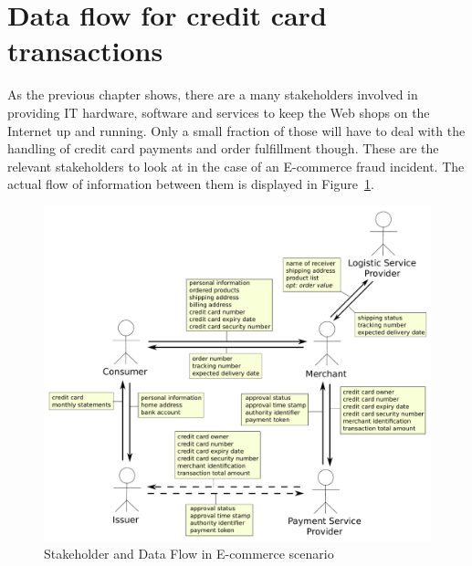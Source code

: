 
\section{Data flow for credit card transactions}
\label{sec:stakeholder_data_flow}

As the previous chapter shows, there are a many stakeholders involved in providing \gls{IT} hardware, software and services to keep the Web shops on the Internet up and running. Only a small fraction of those will have to deal with the handling of credit card payments and order fulfillment though. These are the relevant stakeholders to look at in the case of an \gls{E-commerce} fraud incident. The actual flow of information between them is displayed in  Figure~\ref{fig:images_e_commerce_stakeholder}. \@

\begin{figure}[H]
	\centering
		\includegraphics[width=0.8\columnwidth]{images/e-commerce-stakeholder.pdf}
	\caption{Stakeholder and Data Flow in \gls{E-commerce} scenario}
\label{fig:images_e_commerce_stakeholder}
\end{figure}
